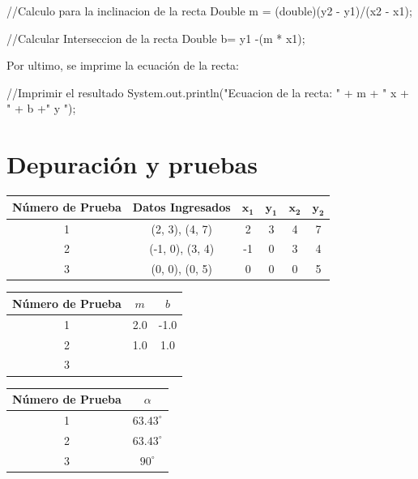 \documentclass{IEEEcsmag}
\begin{document}
\begin{javaCode}
    //Calculo para la inclinacion de la recta  
    Double m = (double)(y2 - y1)/(x2 - x1);
       
    //Calcular Interseccion de la recta
    Double b= y1 -(m * x1);
\end{javaCode}

Por ultimo, se imprime la ecuación de la recta:
\begin{javaCode}
    //Imprimir el resultado 
        System.out.println("Ecuacion de la recta: \n" +
                            m + " x + " + b +" y ");
\end{javaCode}

\section{Depuración y pruebas}
\begin{tabular}{|c|c|c|c|c|c|}
    \hline
    \textbf{Número de Prueba} & \textbf{Datos Ingresados} & \textbf{\(\boldsymbol{x_1}\)} & \textbf{\(\boldsymbol{y_1}\)} & \textbf{\(\boldsymbol{x_2}\)} & \textbf{\(\boldsymbol{y_2}\)} \\
    \hline
    1 & (2, 3), (4, 7) & 2 & 3 & 4 & 7 \\
    \hline
    2 & (-1, 0), (3, 4) & -1 & 0 & 3 & 4 \\
    \hline
    3 & (0, 0), (0, 5) & 0 & 0 & 0 & 5 \\
    \hline
    \end{tabular}
    
    \vspace{0.5cm}
    
    \begin{tabular}{|c|c|c|}
    \hline
    \textbf{Número de Prueba} & \textbf{\(m\)} & \textbf{\(b\)} \\
    \hline
    1 & 2.0 & -1.0 \\
    \hline
    2 & 1.0 & 1.0 \\
    \hline
    3 & \text{--} & \text{--} \\
    \hline
    \end{tabular}
    
    \vspace{0.5cm}
    
    \begin{tabular}{|c|c|}
    \hline
    \textbf{Número de Prueba} & \textbf{\(\alpha\)} \\
    \hline
    1 & \(63.43^\circ\) \\
    \hline
    2 & \(63.43^\circ\) \\
    \hline
    3 & \(90^\circ\) \\
    \hline
    \end{tabular}
\end{document}
